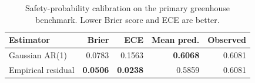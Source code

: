 \begin{table}[t]
\centering
\caption{Safety-probability calibration on the primary greenhouse benchmark. Lower Brier score and ECE are better.}
\label{tab:safety_calibration}
\begin{tabular}{lrrrr}
\hline
Estimator & Brier & ECE & Mean pred. & Observed \\
\hline
Gaussian AR(1) & 0.0783 & 0.1563 & \textbf{0.6068} & 0.6081 \\
Empirical residual & \textbf{0.0506} & \textbf{0.0238} & 0.5859 & 0.6081 \\
\hline
\end{tabular}
\end{table}
